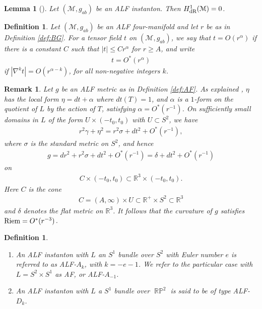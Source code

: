 \documentclass[a4paper,10pt,reqno]{amsart}
\newcommand{\Reals}{\mathbb{R}}
\newcommand{\Riem}{\mathop{\rm Riem}}
\newcommand{\cM}{\mathcal{M}}
\theoremstyle{plain}
\newtheorem{lemma}[thm]{Lemma}
\newtheorem{definition}[thm]{Definition}
\newtheorem{remark}[thm]{Remark}
\DeclareMathOperator{\RP}{\mathbb{R}\mathbb{P}}
\numberwithin{equation}{section}
\begin{document}
\begin{lemma}[] \label{lem:H1zero} 
Let $(\cM, g_{ab})$ be an ALF instanton. Then $H^1_{\text{\rm dR}}(\cM) = 0$. 
\end{lemma} 

\begin{definition} \label{def:ordo} 
Let $(\cM, g_{ab})$ be an ALF four-manifold and let $r$ be as in Definition \ref{def:BG}. For a tensor field $t$ on $(\cM, g_{ab})$, we say that  $t =  O(r^\alpha)$ if  there is a constant $C$ such that $|t| \leq C r^\alpha$ for $r \geq A$, and write 
\begin{align} 
t = O^*(r^\alpha)
\end{align} 
if $|\nabla^k t| = O(r^{\alpha-k})$, for all non-negative integers $k$. 
\end{definition} 

\begin{remark} \label{rem:cone}   
Let $g$ be an ALF metric as in Definition \ref{def:AF}. As explained \cite[Proof~of~Prop.~1.6]{Biquard:Gauduchon},  $\eta$ has the local form $\eta = dt + \alpha$ where $dt(T) = 1$, and $\alpha$ is a $1$-form on the quotient of $L$ by the action of $T$, satisfying $\alpha = O^*(r^{-1})$. On sufficiently small domains in $L$ of the form $U \times (-t_0, t_0)$ with $U \subset S^2$, we have 
\begin{align} 
r^2 \gamma + \eta^2 = r^2 \sigma + dt^2 + O^*(r^{-1}) , 
\end{align} 
where $\sigma$ is the standard metric on $S^2$, and hence 
\begin{align} 
g = dr^2 +  r^2 \sigma + dt^2 + O^*(r^{-1}) = \delta + dt^2 + O^*(r^{-1})
\end{align} 
on 
\begin{align} 
C \times (-t_0,t_0) \subset \Reals^3 \times (-t_0,t_0). 
\end{align} 
Here $C$ is the cone 
\begin{align} 
C = (A, \infty) \times U \subset \Reals^+ \times S^2 \subset \Reals^3  
\end{align} 
and $\delta$ denotes the flat metric on $\Reals^3$. 
It follows that the curvature of $g$ satisfies $\Riem = O^*(r^{-3})$.

\end{remark} 

\begin{definition}\label{def:ALF-Ak} 
\begin{enumerate}
\item
An ALF instanton with $L$ an $S^1$ bundle over $S^2$ with Euler number $e$ is referred to as ALF-$A_k$, with $k = -e -1$. 
We refer to the particular case with $L = S^2 \times S^1$ as AF, or ALF-$A_{-1}$. 
\item 
An ALF instanton with $L$ a $S^1$ bundle over $\RP^2$ is said to be of type ALF-$D_k$. 
\end{enumerate}
\end{definition} 
\end{document}
